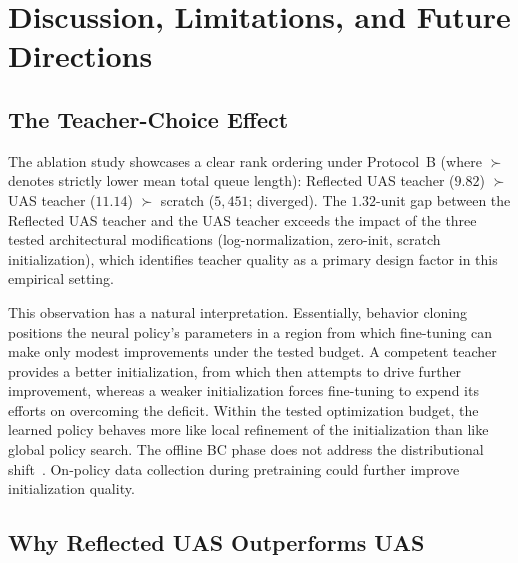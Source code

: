 
\section{Discussion, Limitations, and Future Directions}
\label{sec:discussion}

\subsection{The Teacher-Choice Effect}

The ablation study showcases a clear rank ordering under Protocol~B (where $\succ$ denotes strictly lower mean total queue length): Reflected UAS teacher ($9.82$) $\succ$ UAS teacher ($11.14$) $\succ$ scratch ($5{,}451$; diverged).
The $1.32$-unit gap between the Reflected UAS teacher and the UAS teacher exceeds the impact of the three tested architectural modifications (log-normalization, zero-init, scratch initialization), which identifies teacher quality as a primary design factor in this empirical setting.

This observation has a natural interpretation.
Essentially, behavior cloning positions the neural policy's parameters in a region from which \reinforce{} fine-tuning can make only modest improvements under the tested budget.
A competent teacher provides a better initialization, from which \reinforce{} then attempts to drive further improvement, whereas a weaker initialization forces fine-tuning to expend its efforts on overcoming the deficit.
Within the tested optimization budget, the learned policy behaves more like local refinement of the initialization than like global policy search.
The offline BC phase does not address the distributional shift~\cite{ross2011reduction}.
On-policy data collection during pretraining could further improve initialization quality.

\subsection{Why Reflected UAS Outperforms UAS}

